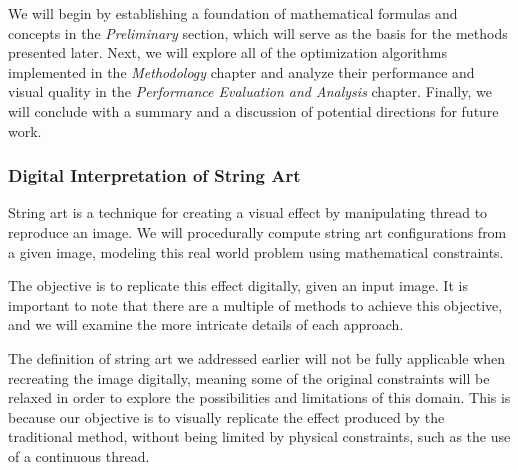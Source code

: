 We will begin by establishing a foundation of mathematical formulas and concepts in the \textit{Preliminary} section, which will serve as the basis for the methods presented later. Next, we will explore all of the optimization algorithms implemented in the \textit{Methodology} chapter and analyze their performance and visual quality in the \textit{Performance Evaluation and Analysis} chapter. Finally, we will conclude with a summary and a discussion of potential directions for future work.

\subsubsection{Digital Interpretation of String Art}

String art is a technique for creating a visual effect by manipulating thread to reproduce an image. We will procedurally compute string art configurations from a given image, modeling this real world problem using mathematical constraints.

The objective is to replicate this effect digitally, given an input image. It is important to note that there are a multiple of methods to achieve this objective, and we will examine the more intricate details of each approach.

The definition of string art we addressed earlier will not be fully applicable when recreating the image digitally, meaning some of the original constraints will be relaxed in order to explore the possibilities and limitations of this domain. This is because our objective is to visually replicate the effect produced by the traditional method, without being limited by physical constraints, such as the use of a continuous thread.

